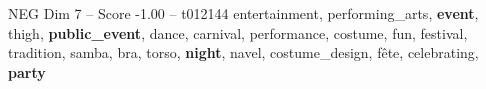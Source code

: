 \begin{textsample}{NEG Dim 7 – Score -1.00 – t012144}  \label{ex:f7_neg_035}
entertainment, performing\_arts, \textbf{event}, thigh, \textbf{public\_event}, dance, carnival, performance, costume, fun, festival, tradition, samba, bra, torso, \textbf{night}, navel, costume\_design, fête, celebrating, \textbf{party}

\end{textsample}
